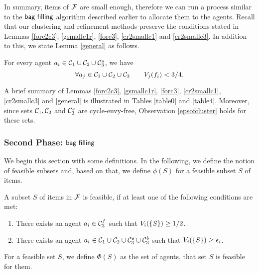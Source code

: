 
In summary, items of $\mathcal{F}$ are small enough, therefore we can run a process similar to the $\textsf{bag filling}$ algorithm described earlier to allocate them to the agents. Recall that our clustering and refinement methods preserve the conditions stated in Lemmas \ref{forc2c3}, \ref{gsmallc1r}, \ref{forc3}, \ref{cr2smallc1} and \ref{cr2smallc3}. In addition to this, we state Lemma \ref{general} as follows.

\begin{lemma}
\label{general}
For every agent $a_i \in \mathcal{C}_1 \cup \mathcal{C}_2 \cup \mathcal{C}_3^s$, we have
$$\forall a_j \in \mathcal{C}_1 \cup \mathcal{C}_2 \cup \mathcal{C}_3 \qquad V_j(f_i)<3/4.$$
\end{lemma}  
A brief summary of Lemmas \ref{forc2c3}, \ref{gsmallc1r}, \ref{forc3}, \ref{cr2smallc1}, \ref{cr2smallc3} and \ref{general} is illustrated in Tables \ref{table0} and \ref{table4}. Moreover, since sets $\mathcal{C}_1,\mathcal{C}_2$ and $\mathcal{C}_3^s$ are cycle-envy-free, Observation \ref{epsofcluster} holds for these sets. 



\subsubsection{Second Phase: $\textsf{bag filling}$}
We begin this section with some definitions. In the following, we define the notion of feasible subsets and, based on that, we define $\phi(S)$ for a feasible subset $S$ of items.
\begin{definition}
A subset $S$ of items in $\mathcal{F}$ is feasible, if at least one of the following conditions are met:
\begin{minipage}[t]{\linegoal}
\begin{enumerate}[leftmargin=30pt]
    \item There exists an agent $a_i \in \mathcal{C}_3^f $ such that  $V_i(\{S\}) \geq {1/2}$. 
    \item There exists an agent $a_i \in \mathcal{C}_1 \cup \mathcal{C}_2 \cup \mathcal{C}_3^s \cup \mathcal{C}_3^b$ such that  $V_i(\{S\}) \geq \epsilon_i$.
\end{enumerate}
\end{minipage}
\end{definition}

\begin{definition}
For a feasible set $S$, we define $\Phi(S)$ as the set of agents, that set $S$ is feasible for them. 
\end{definition}

